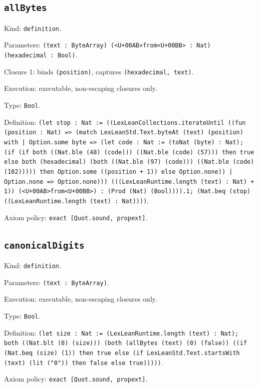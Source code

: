 \documentclass[11pt]{article}
\begin{document}
\subsection*{\texttt{allBytes}}
\noindent Kind: \texttt{definition}.\par
\noindent Parameters: \texttt{(text : ByteArray) (<U+00AB>from<U+00BB> : Nat) (hexadecimal : Bool)}.\par
\noindent Closure 1: binds \texttt{(position)}, captures \texttt{(hexadecimal, text)}.\par
\noindent Execution: executable, non-escaping closures only.\par
\noindent Type: \texttt{Bool}.\par
\noindent Definition: \texttt{(let stop : Nat := ((LexLeanCollections.iterateUntil ((fun (position : Nat) => (match LexLeanStd.Text.byteAt (text) (position) with | Option.some byte => (let code : Nat := (toNat (byte) : Nat); (if (if both ((Nat.ble (48) (code))) ((Nat.ble (code) (57))) then true else both (hexadecimal) (both ((Nat.ble (97) (code))) ((Nat.ble (code) (102))))) then Option.some ((position + 1)) else Option.none)) | Option.none => Option.none))) (((LexLeanRuntime.length (text) : Nat) + 1)) (<U+00AB>from<U+00BB>) : (Prod (Nat) (Bool)))).1; (Nat.beq (stop) ((LexLeanRuntime.length (text) : Nat))))}.\par
\noindent Axiom policy: \texttt{exact [Quot.sound, propext]}.\par
\subsection*{\texttt{canonicalDigits}}
\noindent Kind: \texttt{definition}.\par
\noindent Parameters: \texttt{(text : ByteArray)}.\par
\noindent Execution: executable, non-escaping closures only.\par
\noindent Type: \texttt{Bool}.\par
\noindent Definition: \texttt{(let size : Nat := (LexLeanRuntime.length (text) : Nat); both ((Nat.blt (0) (size))) (both (allBytes (text) (0) (false)) ((if (Nat.beq (size) (1)) then true else (if LexLeanStd.Text.startsWith (text) (lit ("0")) then false else true)))))}.\par
\noindent Axiom policy: \texttt{exact [Quot.sound, propext]}.\par
\end{document}
